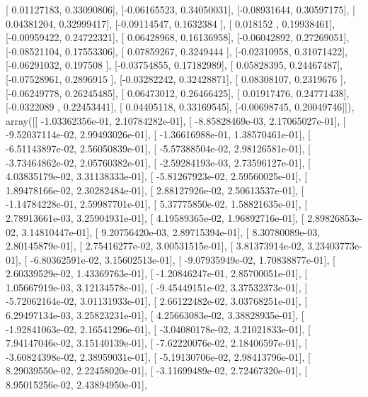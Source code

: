 \documentclass{article}
\begin{document}
       [ 0.01127183,  0.33090806],
       [-0.06165523,  0.34050031],
       [-0.08931644,  0.30597175],
       [ 0.04381204,  0.32999417],
       [-0.09114547,  0.1632384 ],
       [ 0.018152  ,  0.19938461],
       [-0.00959422,  0.24722321],
       [ 0.06428968,  0.16136958],
       [-0.06042892,  0.27269051],
       [-0.08521104,  0.17553306],
       [ 0.07859267,  0.3249444 ],
       [-0.02310958,  0.31071422],
       [-0.06291032,  0.197508  ],
       [-0.03754855,  0.17182989],
       [ 0.05828395,  0.24467487],
       [-0.07528961,  0.2896915 ],
       [-0.03282242,  0.32428871],
       [ 0.08308107,  0.2319676 ],
       [-0.06249778,  0.26245485],
       [ 0.06473012,  0.26466425],
       [ 0.01917476,  0.24771438],
       [-0.0322089 ,  0.22453441],
       [ 0.04405118,  0.33169545],
       [-0.00698745,  0.20049746]]), array([[ -1.03362356e-01,   2.10784282e-01],
       [ -8.85828469e-03,   2.17065027e-01],
       [ -9.52037114e-02,   2.99493026e-01],
       [ -1.36616988e-01,   1.38570461e-01],
       [ -6.51143897e-02,   2.56050839e-01],
       [ -5.57388504e-02,   2.98126581e-01],
       [ -3.73464862e-02,   2.05760382e-01],
       [ -2.59284193e-03,   2.73596127e-01],
       [  4.03835179e-02,   3.31138333e-01],
       [ -5.81267923e-02,   2.59560025e-01],
       [  1.89478166e-02,   2.30282484e-01],
       [  2.88127926e-02,   2.50613537e-01],
       [ -1.14784228e-01,   2.59987701e-01],
       [  5.37775850e-02,   1.58821635e-01],
       [  2.78913661e-03,   3.25904931e-01],
       [  4.19589365e-02,   1.96892716e-01],
       [  2.89826853e-02,   3.14810447e-01],
       [  9.20756420e-03,   2.89715394e-01],
       [  8.30780089e-03,   2.80145879e-01],
       [  2.75416277e-02,   3.00531515e-01],
       [  3.81373914e-02,   3.23403773e-01],
       [ -6.80362591e-02,   3.15602513e-01],
       [ -9.07935949e-02,   1.70838877e-01],
       [  2.60339529e-02,   1.43369763e-01],
       [ -1.20846247e-01,   2.85700051e-01],
       [  1.05667919e-03,   3.12134578e-01],
       [ -9.45449151e-02,   3.37532373e-01],
       [ -5.72062164e-02,   3.01131933e-01],
       [  2.66122482e-02,   3.03768251e-01],
       [  6.29497134e-03,   3.25823231e-01],
       [  4.25663083e-02,   3.38828935e-01],
       [ -1.92841063e-02,   2.16541296e-01],
       [ -3.04080178e-02,   3.21021833e-01],
       [  7.94147046e-02,   3.15140139e-01],
       [ -7.62220076e-02,   2.18406597e-01],
       [ -3.60824398e-02,   2.38959031e-01],
       [ -5.19130706e-02,   2.98413796e-01],
       [  8.29039550e-02,   2.22458020e-01],
       [ -3.11699489e-02,   2.72467320e-01],
       [  8.95015256e-02,   2.43894950e-01],
\end{document}

